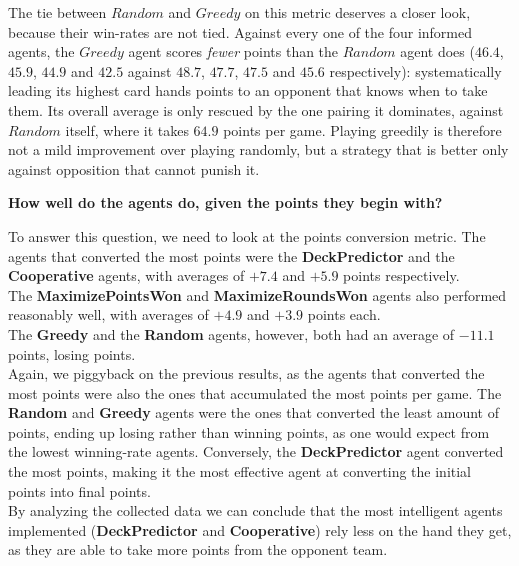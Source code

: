 \documentclass[sigconf]{acmart}
\begin{document}
\noindent The tie between $Random$ and $Greedy$ on this metric deserves a closer look, because their win-rates are not tied. Against every one of the four informed agents, the $Greedy$ agent scores \textit{fewer} points than the $Random$ agent does ($46.4$, $45.9$, $44.9$ and $42.5$ against $48.7$, $47.7$, $47.5$ and $45.6$ respectively): systematically leading its highest card hands points to an opponent that knows when to take them. Its overall average is only rescued by the one pairing it dominates, against $Random$ itself, where it takes $64.9$ points per game. Playing greedily is therefore not a mild improvement over playing randomly, but a strategy that is better only against opposition that cannot punish it.\\

{\centering\fontsize{9}{24}\selectfont\textbf{How well do the agents do, given the points they begin with?}\par}
\vspace{2mm} %

\noindent To answer this question, we need to look at the points conversion metric. The agents that converted the most points were the \textbf{DeckPredictor} and the \textbf{Cooperative} agents, with averages of $+7.4$ and $+5.9$ points respectively.\\
The \textbf{MaximizePointsWon} and \textbf{MaximizeRoundsWon} agents also performed reasonably well, with averages of $+4.9$ and $+3.9$ points each.\\
The \textbf{Greedy} and the \textbf{Random} agents, however, both had an average of $-11.1$ points, losing points.\\

\noindent Again, we piggyback on the previous results, as the agents that converted the most points were also the ones that accumulated the most points per game. The \textbf{Random} and \textbf{Greedy} agents were the ones that converted the least amount of points, ending up losing rather than winning points, as one would expect from the lowest winning-rate agents. Conversely, the \textbf{DeckPredictor} agent converted the most points, making it the most effective agent at converting the initial points into final points.\\

\noindent By analyzing the collected data we can conclude that the most intelligent agents implemented (\textbf{DeckPredictor} and \textbf{Cooperative}) rely less on the hand they get, as they are able to take more points from the opponent team.\\
\end{document}
